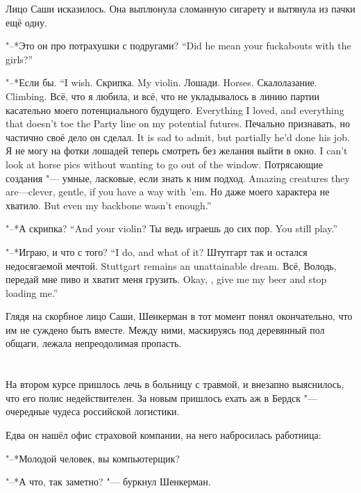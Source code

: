 Лицо Саши исказилось.
Она выплюнула сломанную сигарету и вытянула из пачки ещё одну.

{"--*Это он про потрахушки с подругами?}
{``Did he mean your fuckabouts with the girls?''}

{"--*Если бы.}
{``I wish.}
{Скрипка.}
{My violin.}
{Лошади.}
{Horses.}
{Скалолазание.}
{Climbing.}
{Всё, что я любила, и всё, что не укладывалось в линию партии касательно моего потенциального будущего.}
{Everything I loved, and everything that doesn't toe the Party line on my potential futures.}
{Печально признавать, но частично своё дело он сделал.}
{It is sad to admit, but partially he'd done his job.}
{Я не могу на фотки лошадей теперь смотреть без желания выйти в окно.}
{I can't look at horse pics without wanting to go out of the window.}
{Потрясающие создания "--- умные, ласковые, если знать к ним подход.}
{Amazing creatures they are---clever, gentle, if you have a way with 'em.}
{Но даже моего характера не хватило.}
{But even my backbone wasn't enough.''}

{"--*А скрипка?}
{``And your violin?}
{Ты ведь играешь до сих пор.}
{You still play.''}

{"--*Играю, и что с того?}
{``I do, and what of it?}
{Штутгарт так и остался недосягаемой мечтой.}
{Stuttgart remains an unattainable dream.}
{Всё, Володь, передай мне пиво и хватит меня грузить.}
{Okay, \Volod, give me my beer and stop loading me.''}

Глядя на скорбное лицо Саши, Шенкерман в тот момент понял окончательно, что им не суждено быть вместе.
Между ними, маскируясь под деревянный пол общаги, лежала непреодолимая пропасть.

\chapter{}

\textspace

На втором курсе пришлось лечь в больницу с травмой, и внезапно выяснилось, что его полис недействителен.
За новым пришлось ехать аж в Бердск "--- очередные чудеса российской логистики.

Едва он нашёл офис страховой компании, на него набросилась работница:

"--*Молодой человек, вы компьютерщик?

"--*А что, так заметно? "--- буркнул Шенкерман.

